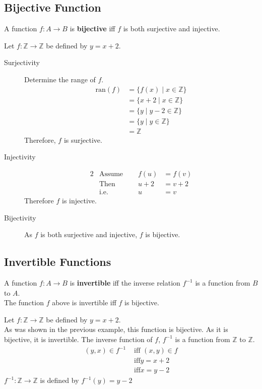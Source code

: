 \documentclass[../notes.tex]{subfiles}
\begin{document}
			\subsection{Bijective Function}
				A function $f: A \rightarrow B$ is \textbf{bijective} iff $f$ is both surjective and injective.
				\begin{examplebox}
					Let $f: \mathbb{Z} \rightarrow \mathbb{Z}$ be defined by $y = x + 2$.
					\begin{description}
						\item[Surjectivity] Determine the range of $f$.
							\begin{align*}
								\mathrm{ran}(f) &= \{f(x) \mid x \in \mathbb{Z}\}\\
								&= \{x + 2 \mid x \in \mathbb{Z}\}\\
								&= \{y \mid y - 2 \in \mathbb{Z}\}\tag*{$x = y - 2$}\\
								&= \{y \mid y \in \mathbb{Z}\}\\
								&= \mathbb{Z}
							\end{align*}
							Therefore, $f$ is surjective.
						\item[Injectivity]
							\begin{alignat*}{2}
								&\text{Assume } \quad &f(u) &= f(v)\\
								&\text{Then } &u + 2 &= v + 2\\
								&\text{i.e.} &u &= v
							\end{alignat*}
							Therefore $f$ is injective.
						\item[Bijectivity] As $f$ is both surjective and injective, $f$ is bijective.
					\end{description}
				\end{examplebox}
			\subsection{Invertible Functions}
				A function $f: A \rightarrow B$ is \textbf{invertible} iff the inverse relation $f^{-1}$ is a function from $B$ to $A$.\\
				The function $f$ above is invertible iff $f$ is bijective.
				\begin{examplebox}
					Let $f: \mathbb{Z} \rightarrow \mathbb{Z}$ be defined by $y = x + 2$.\\
					As was shown in the previous example, this function is bijective. As it is bijective, it is invertible. The inverse function of $f$, $f^{-1}$ is a function from $\mathbb{Z}$ to $\mathbb{Z}$.
					\begin{align*}
						(y, x) \in f^{-1} &\text{ iff } (x, y) \in f\\
						& \text{ iff} y = x + 2\\
						& \text{ iff} x = y - 2
					\end{align*}
					$f^{-1}: \mathbb{Z} \rightarrow \mathbb{Z}$ is defined by $f^{-1}(y) = y - 2$
				\end{examplebox}
\end{document}
